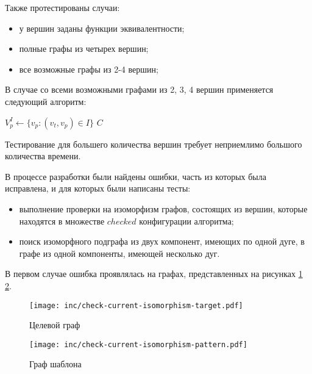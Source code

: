 Также протестированы случаи:
\begin{itemize}
\item у вершин заданы функции эквивалентности;
\item полные графы из четырех вершин;
\item все возможные графы из 2-4 вершин;
\end{itemize}

В случае со всеми возможными графами из 2, 3, 4 вершин применяется следующий алгоритм:

\begin{algorithmic}
                \State {}
                \State $V^I_p \gets \{ v_p : (v_t, v_p) \in I \}$
                \State {}
            \EndFor
        \EndFor
    \EndFor
\EndFor
\State \Return $C$
\end{algorithmic}

Тестирование для большего количества вершин требует неприемлимо большого
количества времени.

В процессе разработки были найдены ошибки, часть из которых была исправлена,
и для которых были написаны тесты:
\begin{itemize}
\item выполнение проверки на изоморфизм графов, состоящих из вершин,
которые находятся в множестве $checked$ конфигурации алгоритма;
\item поиск изоморфного подграфа из двух компонент, имеющих по одной дуге,
в графе из одной компоненты, имеющей несколько дуг.
\end{itemize}

В первом случае ошибка проявлялась на графах, представленных на
рисунках \ref{fig:check-current-isomorphism-target}
\ref{fig:check-current-isomorphism-pattern}.

\begin{figure}[!ht]
\centering
\texttt{[image: inc/check-current-isomorphism-target.pdf]}
\caption{Целевой граф}
\label{fig:check-current-isomorphism-target}
\end{figure}

\begin{figure}[!ht]
\centering
\texttt{[image: inc/check-current-isomorphism-pattern.pdf]}
\caption{Граф шаблона}
\label{fig:check-current-isomorphism-pattern}
\end{figure}


